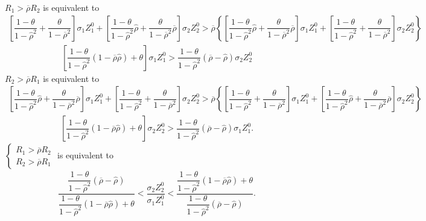 \documentclass[10pt]{article}
\begin{document}
$ R_1 > \overline{\rho} R_2 $ is equivalent to 
{\footnotesize \begin{eqnarray*}
\left[ \dfrac{1 - \theta}{1 - {\hat \rho}^2} + \dfrac{\theta}{1 - \overline{\rho}^2} \right] \sigma_1 Z_1^0 + \left[ \dfrac{1 - \theta}{1 - {\hat \rho}^2} {\hat \rho} + \dfrac{\theta}{1 - \overline{\rho}^2} \overline{\rho} \right] \sigma_2 Z_2^0 > \overline{\rho} \left\{ \left[ \dfrac{1 - \theta}{1 - {\hat \rho}^2} {\hat \rho} + \dfrac{\theta}{1 - \overline{\rho}^2} \overline{\rho} \right] \sigma_1 Z_1^0 + \left[ \dfrac{1 - \theta}{1 - {\hat \rho}^2} + \dfrac{\theta}{1 - \overline{\rho}^2} \right] \sigma_2 Z_2^0 \right\}
\end{eqnarray*}}
\begin{eqnarray*}
\left[ \dfrac{1 - \theta}{1 - {\hat \rho}^2} (1 - \overline{\rho} {\hat \rho}) + \theta \right] \sigma_1 Z_1^0 > \dfrac{1 - \theta}{1 - {\hat \rho}^2} (\overline{\rho} - {\hat \rho}) \sigma_2 Z_2^0
\end{eqnarray*}
$ R_2 > \overline{\rho} R_1 $ is equivalent to 
{\footnotesize \begin{eqnarray*}
\left[ \dfrac{1 - \theta}{1 - {\hat \rho}^2} {\hat \rho} + \dfrac{\theta}{1 - \overline{\rho}^2} \overline{\rho} \right] \sigma_1 Z_1^0 + \left[ \dfrac{1 - \theta}{1 - {\hat \rho}^2} + \dfrac{\theta}{1 - \overline{\rho}^2} \right] \sigma_2 Z_2^0 > \overline{\rho} \left\{ \left[ \dfrac{1 - \theta}{1 - {\hat \rho}^2} + \dfrac{\theta}{1 - \overline{\rho}^2} \right] \sigma_1 Z_1^0 + \left[ \dfrac{1 - \theta}{1 - {\hat \rho}^2} {\hat \rho} + \dfrac{\theta}{1 - \overline{\rho}^2} \overline{\rho} \right] \sigma_2 Z_2^0 \right\}
\end{eqnarray*}}
\begin{eqnarray*}
\left[ \dfrac{1 - \theta}{1 - {\hat \rho}^2} (1 - \overline{\rho} {\hat \rho}) + \theta \right] \sigma_2 Z_2^0 > \dfrac{1 - \theta}{1 - {\hat \rho}^2} (\overline{\rho} - {\hat \rho}) \sigma_1 Z_1^0.
\end{eqnarray*}
$ \left\{ \begin{matrix} R_1 > \overline{\rho} R_2 \\ R_2 > \overline{\rho} R_1 \end{matrix} \right. $ is equivalent to 
\begin{eqnarray*}
\dfrac{\dfrac{1 - \theta}{1 - {\hat \rho}^2} (\overline{\rho} - {\hat \rho})}{\dfrac{1 - \theta}{1 - {\hat \rho}^2} (1 - \overline{\rho} {\hat \rho}) + \theta} < \dfrac{\sigma_2 Z_2^0}{\sigma_1 Z_1^0} < \dfrac{\dfrac{1 - \theta}{1 - {\hat \rho}^2} (1 - \overline{\rho} {\hat \rho}) + \theta}{\dfrac{1 - \theta}{1 - {\hat \rho}^2} (\overline{\rho} - {\hat \rho})}.
\end{eqnarray*}
\end{document}
